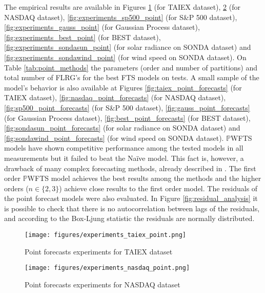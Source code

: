 The empirical results are available in Figures  \ref{fig:experiments_taiex_point} (for TAIEX dataset),  \ref{fig:experiments_nasdaq_point} (for NASDAQ dataset),  \ref{fig:experiments_sp500_point} (for S\&P 500 dataset),  \ref{fig:experiments_gauss_point} (for Gaussian Process dataset),  \ref{fig:experiments_best_point} (for BEST dataset),  \ref{fig:experiments_sondasun_point} (for solar radiance on SONDA dataset) and \ref{fig:experiments_sondawind_point} (for wind speed on SONDA dataset). On Table \ref{tab:point_methods} the parameters (order and number of partitions)  and total number of FLRG's for the best FTS models on tests. A small sample of the model's behavior is also available at Figures  \ref{fig:taiex_point_forecasts} (for TAIEX dataset),  \ref{fig:nasdaq_point_forecasts} (for NASDAQ dataset),  \ref{fig:sp500_point_forecasts} (for S\&P 500 dataset),  \ref{fig:gauss_point_forecasts} (for Gaussian Process dataset),  \ref{fig:best_point_forecasts} (for BEST dataset),  \ref{fig:sondasun_point_forecasts} (for solar radiance on SONDA dataset) and \ref{fig:sondawind_point_forecasts} (for wind speed on SONDA dataset).  $\mathbb{P}$WFTS models have shown competitive performance among the tested models in all measurements but it failed to beat the Na\"{i}ve model. This fact is, however, a drawback of many complex forecasting methods, already described in \cite{Makridakis2000}.  The first order $\mathbb{P}$WFTS model achieves the best results among the methods and the higher orders ($n \in \{2,3\}$) achieve close results to the first order model. The residuals of the point forecast models were also evaluated. In Figure \ref{fig:residual_analysis} it is possible to check that there is no autocorrelation between lags of the residuals, and according to the Box-Ljung statistic the residuals are normally distributed.

\newcommand{\AVG}{$\mu$}
\newcommand{\STD}{$\sigma^2$}

\begin{figure}
\texttt{[image: figures/experiments\_taiex\_point.png]}
\caption{Point forecasts experiments for TAIEX dataset}
\label{fig:experiments_taiex_point}
\end{figure}

\begin{figure}
\texttt{[image: figures/experiments\_nasdaq\_point.png]}
\caption{Point forecasts experiments for NASDAQ dataset}
\label{fig:experiments_nasdaq_point}
\end{figure}

